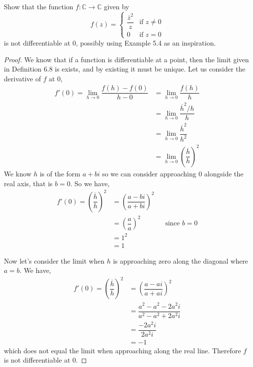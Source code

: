\documentclass[11pt]{article}
\newenvironment{problem}[2][Problem\!]{\begin{trivlist}
\item[\hskip \labelsep {\bfseries #1}\hskip \labelsep {\bfseries #2}]}{\end{trivlist}}
\newcommand{\cc}{\mathbb C}   %
\newcommand{\lrp}[1]{\left(#1\right)}
\begin{document}
\begin{problem}{3.3}
Show that the function $f : \cc \to \cc$ given by
\[f(z) = \begin{cases} \dfrac{\overline{z}^2}{z} & \text{if }z \neq 0\\[1em] 0 & \text{if } z = 0 \end{cases}\]
is not differentiable at $0$, possibly using Example 5.4 as an inspiration.
\end{problem}
\begin{proof}
  We know that if a function is differentiable at a point, then the limit given in Definition 6.8 is exists, and by existing it must be unique. Let us consider the derivative of $f$ at $0$,
  \begin{align*}
    f'(0) = \lim_{h \to 0}\dfrac{f(h) - f(0)}{h - 0} &= \lim_{h \to 0}\dfrac{f(h)}{h} \\ 
    &= \lim_{h \to 0}\dfrac{\overline{h}^{2}/h}{h} \\
    &= \lim_{h \to 0}\dfrac{\overline{h}^{2}}{h^{2}} \\
    &= \lim_{h \to 0}\lrp{\dfrac{\overline{h}}{h}}^{2}
  \end{align*}
  We know $h$ is of the form $a+ bi$ so we can consider approaching $0$ alongside the real axis, that is $b = 0$. So we have,
  \begin{align*}
    f'(0) = \lrp{\dfrac{\overline{h}}{h}}^{2} &= \lrp{\dfrac{a - bi}{a+bi}}^{2} \\
    &= \lrp{\dfrac{a}{a}}^{2} &&\text{since $b = 0$} \\
    &= 1^{2} \\
    &= 1
  \end{align*}

  Now let's consider the limit when $h$ is approaching zero along the diagonal where $a = b$. We have,
  \begin{align*}
    f'(0) = \lrp{\dfrac{\overline{h}}{h}}^{2} &= \lrp{\dfrac{a - ai}{a + ai}}^{2} \\
    &= \dfrac{a^{2}- a^{2} -2a^{2}i}{a^{2} -a^{2} +2a^{2}i } \\
    &= \dfrac{-2a^{2}i}{2a^{2}i} \\
    &= -1
  \end{align*}
  which does not equal the limit when approaching along the real line. Therefore $f$ is not differentiable at 0. 
\end{proof}

\newpage  %
\end{document}

